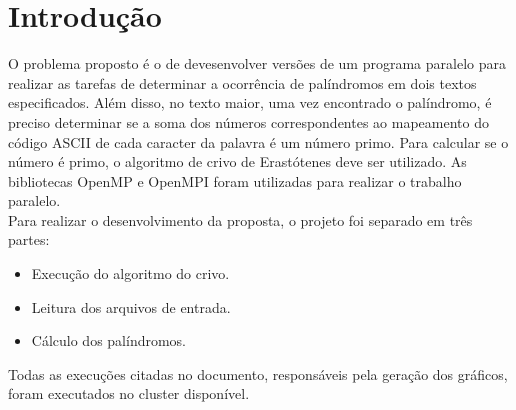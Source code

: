 \documentclass[a4paper]{article}
\begin{document}
\section{Introdução}
\indent \indent O problema proposto é o de devesenvolver versões de um programa paralelo para realizar as tarefas de determinar a ocorrência de palíndromos em dois textos especificados. Além disso, no texto maior, uma vez encontrado o palíndromo, é preciso determinar se a soma dos números correspondentes ao mapeamento do código ASCII de cada caracter da palavra é um número primo. Para calcular se o número é primo, o algoritmo de crivo de Erastótenes deve ser utilizado. As bibliotecas OpenMP e OpenMPI foram utilizadas para realizar o trabalho paralelo.\\
\indent Para realizar o desenvolvimento da proposta, o projeto foi separado em três partes:
\begin{itemize}
	\item Execução do algoritmo do crivo.
	\item Leitura dos arquivos de entrada.
	\item Cálculo dos palíndromos.
\end{itemize}
\indent \indent Todas as execuções citadas no documento, responsáveis pela geração dos gráficos, foram executados no cluster disponível.
\end{document}
